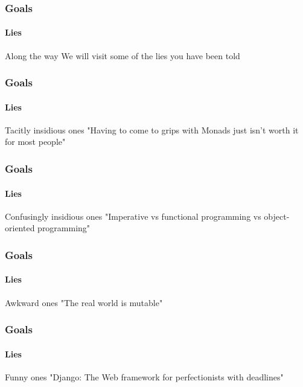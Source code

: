 \begin{frame}
\frametitle{Goals}
\framesubtitle{Lies}
\begin{block}{Along the way}
We will visit some of the lies you have been told
\end{block}
\end{frame}


\begin{frame}
\frametitle{Goals}
\framesubtitle{Lies}
\begin{block}{Tacitly insidious ones}
"Having to come to grips with Monads just isn't worth it for most people"
\end{block}
\end{frame}


\begin{frame}
\frametitle{Goals}
\framesubtitle{Lies}
\begin{block}{Confusingly insidious ones}
"Imperative vs functional programming vs object-oriented programming"
\end{block}
\end{frame}


\begin{frame}
\frametitle{Goals}
\framesubtitle{Lies}
\begin{block}{Awkward ones}
"The real world is mutable"
\end{block}
\end{frame}


\begin{frame}
\frametitle{Goals}
\framesubtitle{Lies}
\begin{block}{Funny ones}
"Django: The Web framework for perfectionists with deadlines"
\end{block}
\end{frame}

